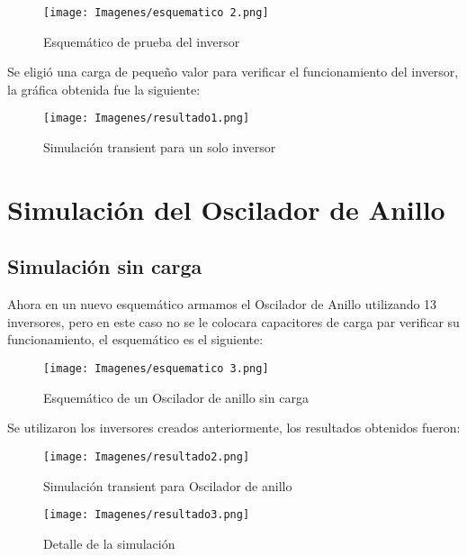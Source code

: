\documentclass[11pt, a4paper]{article}
\begin{document}
   \begin{figure}[H]
    \centering
    \texttt{[image: Imagenes/esquematico 2.png]}
    \caption{Esquemático de prueba del inversor}
    \label{fig:esquematico 2}
    \end{figure}

    Se eligió una carga de pequeño valor para verificar el funcionamiento del inversor, la gráfica obtenida fue la siguiente:

   \begin{figure}[H]
    \centering
    \texttt{[image: Imagenes/resultado1.png]}
    \caption{Simulación transient para un solo inversor}
    \label{fig:resultado1}
    \end{figure}

\section{Simulación del Oscilador de Anillo}

\subsection{Simulación sin carga}


Ahora en un nuevo esquemático armamos el Oscilador de Anillo utilizando 13 inversores, pero en este caso no se le colocara capacitores de carga par verificar su funcionamiento, el esquemático es el siguiente:

\begin{figure}[H]
    \centering
    \texttt{[image: Imagenes/esquematico 3.png]}
    \caption{Esquemático de un Oscilador de anillo sin carga}
    \label{fig:esquematico 3}
    \end{figure}
Se utilizaron los inversores creados anteriormente, los resultados obtenidos fueron:




\begin{figure}[H]
    \centering
    \texttt{[image: Imagenes/resultado2.png]}
    \caption{Simulación transient para Oscilador de anillo}
    \label{fig:resultado2}
    \end{figure}



\begin{figure}[H]
    \centering
    \texttt{[image: Imagenes/resultado3.png]}
    \caption{Detalle de la simulación}
    \label{fig:resultado3}
    \end{figure}
\end{document}

